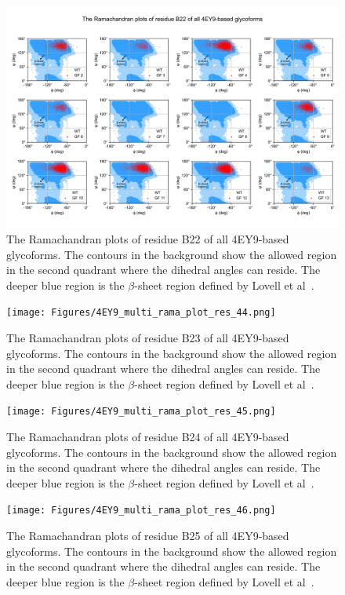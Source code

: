 \documentclass[sn-vancouver]{sn-jnl}
\begin{document}
\renewcommand{\thefigure}{S\arabic{figure}}
\begin{figure}[H]
\centering
\includegraphics[width=\textwidth]{Figures/4EY9_multi_rama_plot_res_43.png}
\caption{The Ramachandran plots of residue B22 of all 4EY9-based glycoforms. The contours in the background show the allowed region in the second quadrant where the dihedral angles can reside. The deeper blue region is the $\beta$-sheet region defined by Lovell et al~\cite{lovell2003structure}.}
\end{figure}

\renewcommand{\thefigure}{S\arabic{figure}}
\begin{figure}[H]
\centering
\texttt{[image: Figures/4EY9\_multi\_rama\_plot\_res\_44.png]}
\caption{The Ramachandran plots of residue B23 of all 4EY9-based glycoforms. The contours in the background show the allowed region in the second quadrant where the dihedral angles can reside. The deeper blue region is the $\beta$-sheet region defined by Lovell et al~\cite{lovell2003structure}.}
\end{figure}

\renewcommand{\thefigure}{S\arabic{figure}}
\begin{figure}[H]
\centering
\texttt{[image: Figures/4EY9\_multi\_rama\_plot\_res\_45.png]}
\caption{The Ramachandran plots of residue B24 of all 4EY9-based glycoforms. The contours in the background show the allowed region in the second quadrant where the dihedral angles can reside. The deeper blue region is the $\beta$-sheet region defined by Lovell et al~\cite{lovell2003structure}.}
\end{figure}

\renewcommand{\thefigure}{S\arabic{figure}}
\begin{figure}[H]
\centering
\texttt{[image: Figures/4EY9\_multi\_rama\_plot\_res\_46.png]}
\caption{The Ramachandran plots of residue B25 of all 4EY9-based glycoforms. The contours in the background show the allowed region in the second quadrant where the dihedral angles can reside. The deeper blue region is the $\beta$-sheet region defined by Lovell et al~\cite{lovell2003structure}.}
\end{figure}
\end{document}
